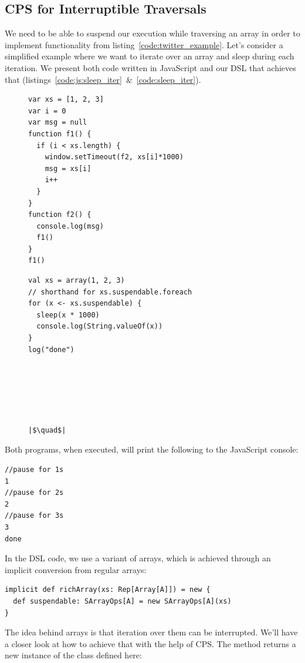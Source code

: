 \documentclass[runningheads,a4paper]{llncs}
\begin{document}
\subsection{CPS for Interruptible Traversals}
We need to be able to suspend our execution while traversing an array in order to implement functionality from listing~\ref{code:twitter_example}. Let's consider a simplified example where we want to iterate over an array and sleep during each iteration. We present both code written in JavaScript and our DSL that achieves that (listings~\ref{code:js:sleep_iter}~\&~\ref{code:sleep_iter}).
\begin{figure}
\lstset{basicstyle=\ttfamily\scriptsize}
\begin{changemargin}{-0.7cm}{-0.7cm}
\setlength{\columnseprule}{0.5pt}
\begin{multicols}{2}
\begin{lstlisting}[caption=JavaScript,label=code:js:sleep_iter]
var xs = [1, 2, 3]
var i = 0
var msg = null
function f1() {
  if (i < xs.length) {
    window.setTimeout(f2, xs[i]*1000)
    msg = xs[i]
    i++
  }
}
function f2() {
  console.log(msg)
  f1()
}
f1()
\end{lstlisting}
\begin{lstlisting}[escapechar=|,caption=DSL,label=code:sleep_iter]
val xs = array(1, 2, 3)
// shorthand for xs.suspendable.foreach
for (x <- xs.suspendable) {
  sleep(x * 1000)
  console.log(String.valueOf(x))
}
log("done")






|$\quad$|
\end{lstlisting}
\end{multicols}
\end{changemargin}
\lstset{basicstyle=\ttfamily}
\end{figure}

Both programs, when executed, will print the following to the JavaScript console:
\begin{lstlisting}
//pause for 1s
1
//pause for 2s
2
//pause for 3s
3
done
\end{lstlisting}

In the DSL code, we use a  variant of arrays, which is achieved through an implicit conversion from regular arrays:
\begin{lstlisting}
implicit def richArray(xs: Rep[Array[A]]) = new {
  def suspendable: SArrayOps[A] = new SArrayOps[A](xs)
}
\end{lstlisting}
The idea behind  arrays is that iteration over them can be interrupted. We'll have a closer look at how to achieve that with the help of CPS. The  method returns a new instance of the  class defined here:
\end{document}
